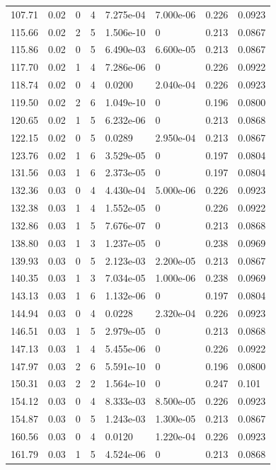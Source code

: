 \documentclass[preview]{standalone}
\begin{document}
{{{\begin{tabular}{L{1.2cm}C{1.2cm} C{0.3cm}C{0.5cm} C{1.4cm}C{1.4cm} C{1.4cm}C{1.4cm}}
  107.71  &  0.02  & 0     &  4 &  7.275e-04  & 7.000e-06  & 0.226 &  0.0923   \\ 
  115.66  &  0.02  & 2     &  5 &  1.506e-10  & 0  & 0.213 &  0.0867   \\ 
  115.86  &  0.02  & 0     &  5 &  6.490e-03  & 6.600e-05  & 0.213 &  0.0867   \\ 
  117.70  &  0.02  & 1     &  4 &  7.286e-06  & 0  & 0.226 &  0.0922   \\ 
  118.74  &  0.02  & 0     &  4 &  0.0200  & 2.040e-04  & 0.226 &  0.0923   \\ 
  119.50  &  0.02  & 2     &  6 &  1.049e-10  & 0  & 0.196 &  0.0800   \\ 
  120.65  &  0.02  & 1     &  5 &  6.232e-06  & 0  & 0.213 &  0.0868   \\ 
  122.15  &  0.02  & 0     &  5 &  0.0289  & 2.950e-04  & 0.213 &  0.0867   \\ 
  123.76  &  0.02  & 1     &  6 &  3.529e-05  & 0  & 0.197 &  0.0804   \\ 
  131.56  &  0.03  & 1     &  6 &  2.373e-05  & 0  & 0.197 &  0.0804   \\ 
  132.36  &  0.03  & 0     &  4 &  4.430e-04  & 5.000e-06  & 0.226 &  0.0923   \\ 
  132.38  &  0.03  & 1     &  4 &  1.552e-05  & 0  & 0.226 &  0.0922   \\ 
  132.86  &  0.03  & 1     &  5 &  7.676e-07  & 0  & 0.213 &  0.0868   \\ 
  138.80  &  0.03  & 1     &  3 &  1.237e-05  & 0  & 0.238 &  0.0969   \\ 
  139.93  &  0.03  & 0     &  5 &  2.123e-03  & 2.200e-05  & 0.213 &  0.0867   \\ 
  140.35  &  0.03  & 1     &  3 &  7.034e-05  & 1.000e-06  & 0.238 &  0.0969   \\ 
  143.13  &  0.03  & 1     &  6 &  1.132e-06  & 0  & 0.197 &  0.0804   \\ 
  144.94  &  0.03  & 0     &  4 &  0.0228  & 2.320e-04  & 0.226 &  0.0923   \\ 
  146.51  &  0.03  & 1     &  5 &  2.979e-05  & 0  & 0.213 &  0.0868   \\ 
  147.13  &  0.03  & 1     &  4 &  5.455e-06  & 0  & 0.226 &  0.0922   \\ 
  147.97  &  0.03  & 2     &  6 &  5.591e-10  & 0  & 0.196 &  0.0800   \\ 
  150.31  &  0.03  & 2     &  2 &  1.564e-10  & 0  & 0.247 &  0.101   \\ 
  154.12  &  0.03  & 0     &  4 &  8.333e-03  & 8.500e-05  & 0.226 &  0.0923   \\ 
  154.87  &  0.03  & 0     &  5 &  1.243e-03  & 1.300e-05  & 0.213 &  0.0867   \\ 
  160.56  &  0.03  & 0     &  4 &  0.0120  & 1.220e-04  & 0.226 &  0.0923   \\ 
  161.79  &  0.03  & 1     &  5 &  4.524e-06  & 0  & 0.213 &  0.0868   \\ 
\hline 
\end{tabular} 

}}}
\end{document}
